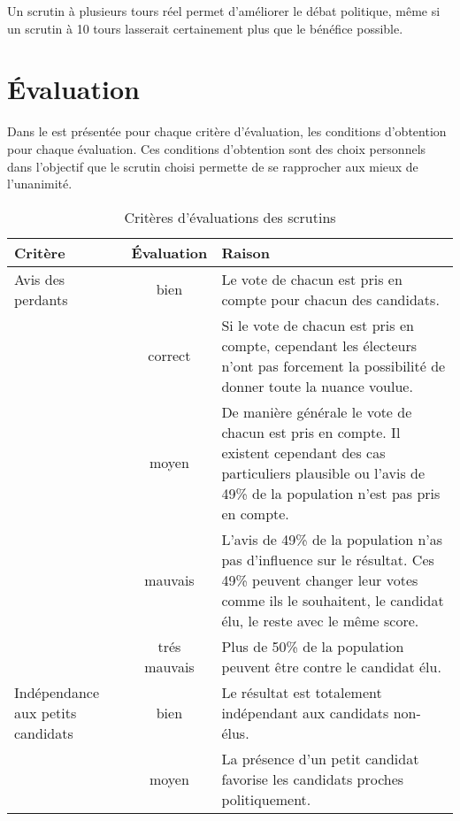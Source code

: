\documentclass[../report]{subfiles}
\begin{document}
  Un scrutin à plusieurs tours réel permet d'améliorer le débat politique, même si un scrutin 
  à 10 tours lasserait certainement plus que le bénéfice possible.

  \section{Évaluation}
  
  Dans le  est présentée pour chaque critère d'évaluation, les conditions d'obtention pour chaque évaluation.
  Ces conditions d'obtention sont des choix personnels dans l'objectif que le scrutin choisi permette de se rapprocher aux mieux de l'unanimité.

  \begin{table}
  \caption{Critères d'évaluations des scrutins}%
  \label{tab:criteres:scrutin}%
  \begin{center}
    \begin{tabular}{p{8em}|c|p{28em}}
      \hline
      Critère & Évaluation & Raison \\
      \hline
      \hline
      Avis des perdants & \cellcolor{green}bien & Le vote de chacun est pris en compte pour chacun des candidats. \\
      \cline{2-3}       & \cellcolor{green!25!yellow}correct & Si le vote de chacun est pris en compte, cependant les électeurs n'ont pas forcement la possibilité de donner toute la nuance voulue. \\
      \cline{2-3}       & \cellcolor{orange}moyen & De manière générale le vote de chacun est pris en compte. Il existent cependant des cas particuliers plausible ou l'avis de 49\% de la population n'est pas pris en compte. \\
      \cline{2-3}       & \cellcolor{red}mauvais & L'avis de 49\% de la population n'as pas d’influence sur le résultat. Ces 49\% peuvent changer leur votes comme ils le souhaitent, le candidat élu, le reste avec le même score. \\
      \cline{2-3}       & \cellcolor{red}trés mauvais & Plus de 50\% de la population peuvent être contre le candidat élu. \\
      \hline
      Indépendance aux petits candidats & \cellcolor{green}bien & Le résultat est totalement indépendant aux candidats non-élus. \\
      \cline{2-3}
                       & \cellcolor{orange}moyen & La présence d'un petit candidat favorise les candidats proches politiquement. \\

\end{tabular}
\end{center}
\end{table}
\end{document}
